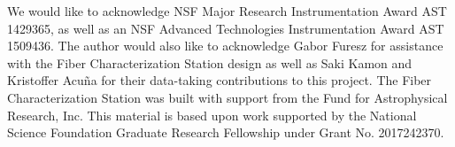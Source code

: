 \documentclass[twocolumn]{emulateapj}
\begin{document}
We would like to acknowledge NSF Major Research Instrumentation Award AST 1429365, as well as an NSF Advanced Technologies Instrumentation Award AST 1509436. The author would also like to acknowledge Gabor Furesz for assistance with the Fiber Characterization Station design as well as Saki Kamon and Kristoffer Acu\~na for their data-taking contributions to this project. The Fiber Characterization Station was built with support from the Fund for Astrophysical Research, Inc. This material is based upon work supported by the National Science Foundation Graduate Research Fellowship under Grant No. 2017242370.

\end{document}
